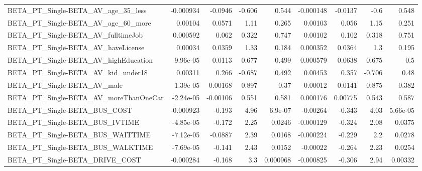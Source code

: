 \begin{tabular}{lrrrrrrrr}
BETA\_PT\_Single-BETA\_AV\_age\_35\_less                 &   -0.000934 &      -0.0946 &   -0.606 &    0.544 &  -0.000148 &     -0.0137 &         -0.6 &         0.548 \\
BETA\_PT\_Single-BETA\_AV\_age\_60\_more                 &     0.00104 &       0.0571 &     1.11 &    0.265 &    0.00103 &       0.056 &         1.15 &         0.251 \\
BETA\_PT\_Single-BETA\_AV\_fulltimeJob                 &    0.000592 &        0.062 &    0.322 &    0.747 &    0.00102 &       0.102 &        0.318 &         0.751 \\
BETA\_PT\_Single-BETA\_AV\_haveLicense                 &     0.00034 &       0.0359 &     1.33 &    0.184 &   0.000352 &      0.0364 &          1.3 &         0.195 \\
BETA\_PT\_Single-BETA\_AV\_highEducation               &    9.96e-05 &       0.0113 &    0.677 &    0.499 &   0.000579 &      0.0638 &        0.675 &           0.5 \\
BETA\_PT\_Single-BETA\_AV\_kid\_under18                 &     0.00311 &        0.266 &   -0.687 &    0.492 &    0.00453 &       0.357 &       -0.706 &          0.48 \\
BETA\_PT\_Single-BETA\_AV\_male                        &    1.39e-05 &      0.00168 &    0.897 &     0.37 &    0.00012 &      0.0141 &        0.875 &         0.382 \\
BETA\_PT\_Single-BETA\_AV\_moreThanOneCar              &   -2.24e-05 &     -0.00106 &    0.551 &    0.581 &   0.000176 &     0.00775 &        0.543 &         0.587 \\
BETA\_PT\_Single-BETA\_BUS\_COST                       &   -0.000923 &       -0.193 &     4.96 &  6.9e-07 &   -0.00264 &      -0.343 &         4.03 &      5.66e-05 \\
BETA\_PT\_Single-BETA\_BUS\_IVTIME                     &   -4.85e-05 &       -0.172 &     2.25 &   0.0246 &  -0.000129 &      -0.324 &         2.08 &        0.0375 \\
BETA\_PT\_Single-BETA\_BUS\_WAITTIME                   &   -7.12e-05 &      -0.0887 &     2.39 &   0.0168 &  -0.000224 &      -0.229 &          2.2 &        0.0278 \\
BETA\_PT\_Single-BETA\_BUS\_WALKTIME                   &   -7.69e-05 &       -0.141 &     2.43 &   0.0152 &   -0.00022 &      -0.264 &         2.23 &        0.0254 \\
BETA\_PT\_Single-BETA\_DRIVE\_COST                     &   -0.000284 &       -0.168 &      3.3 & 0.000968 &  -0.000825 &      -0.306 &         2.94 &       0.00332 \\

\end{tabular}
